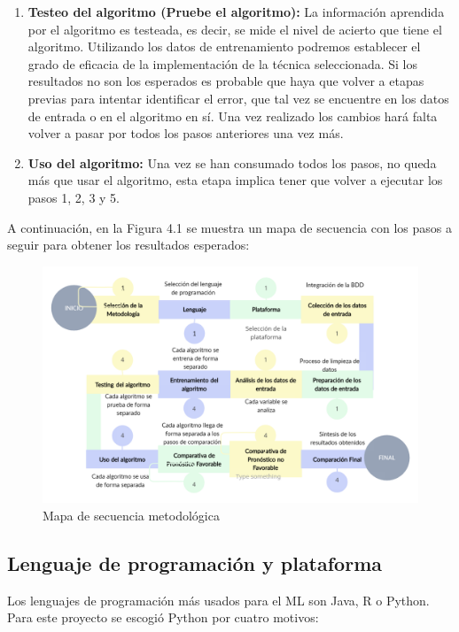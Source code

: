 \begin{enumerate}
	\item \textbf{Testeo del algoritmo (Pruebe el algoritmo):} La información aprendida por el algoritmo es testeada, es decir, se mide el nivel de acierto que tiene el algoritmo. Utilizando los datos de entrenamiento podremos establecer el grado de eficacia de la implementación de la técnica seleccionada. Si los resultados no son los esperados es probable que haya que volver a etapas previas para intentar identificar el error, que tal vez se encuentre en los datos de entrada o en el algoritmo en sí. Una vez realizado los cambios hará falta volver a pasar por todos los pasos anteriores una vez más.
\item \textbf{Uso del algoritmo:} Una vez se han consumado todos los pasos, no queda
más que usar el algoritmo, esta etapa implica tener que volver a ejecutar los pasos 1, 2, 3 y 5.\\
\end{enumerate}

\par A continuación, en la Figura 4.1 se muestra un mapa de secuencia con los pasos a seguir para obtener los resultados esperados:

\begin{figure}[H]
	\centering
	\includegraphics[scale=0.65]{img/mapaDetiempo.png} 
	\caption{Mapa de secuencia metodológica}
	\label{fig:mapaDeTiempo}
\end{figure}


\doublespacing
\subsection{Lenguaje de programación y plataforma}
Los lenguajes de programación más usados para el ML son Java, R o Python. Para este proyecto se escogió Python por cuatro motivos: 

